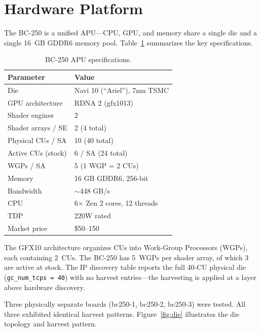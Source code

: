 \documentclass[11pt,twocolumn]{article}
\begin{document}
\section{Hardware Platform}

The BC-250 is a unified APU---CPU, GPU, and memory share a single die and a single 16~GB GDDR6 memory pool. Table~\ref{tab:hw} summarizes the key specifications.

\begin{table}[H]
\centering
\caption{BC-250 APU specifications.}
\label{tab:hw}
\small
\begin{tabular}{@{}ll@{}}
\toprule
\textbf{Parameter} & \textbf{Value} \\
\midrule
Die & Navi 10 (``Ariel''), 7nm TSMC \\
GPU architecture & RDNA 2 (gfx1013) \\
Shader engines & 2 \\
Shader arrays / SE & 2 (4 total) \\
Physical CUs / SA & 10 (40 total) \\
Active CUs (stock) & 6 / SA (24 total) \\
WGPs / SA & 5 (1 WGP = 2 CUs) \\
Memory & 16 GB GDDR6, 256-bit \\
Bandwidth & $\sim$448 GB/s \\
CPU & 6$\times$ Zen 2 cores, 12 threads \\
TDP & 220W rated \\
Market price & \$50--150 \\
\bottomrule
\end{tabular}
\end{table}

The GFX10 architecture organizes CUs into Work-Group Processors (WGPs), each containing 2~CUs. The BC-250 has 5~WGPs per shader array, of which 3 are active at stock. The IP discovery table reports the full 40-CU physical die (\texttt{gc\_num\_tcps\,=\,40}) with no harvest entries---the harvesting is applied at a layer above hardware discovery.

Three physically separate boards (bc250-1, bc250-2, bc250-3) were tested. All three exhibited identical harvest patterns. Figure~\ref{fig:die} illustrates the die topology and harvest pattern.
\end{document}
